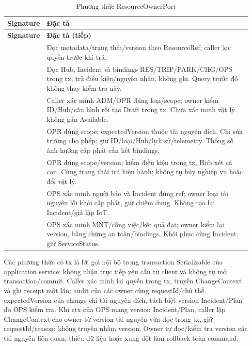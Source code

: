 \begin{longtable}{|L{58mm}|L{81mm}|}
\caption{Phương thức ResourceOwnerPort}\label{tab:p3-resource-owner-port}\\\hline
\textbf{Signature} & \textbf{Đặc tả}\\\hline
\endfirsthead
\hline\textbf{Signature} & \textbf{Đặc tả (tiếp)}\\\hline\endhead
{} &
Đọc metadata/trạng thái/version theo ResourceRef; caller lọc quyền trước khi trả.\\\hline
{} &
Đọc Hub, Incident và bindings RES/TRIP/PARK/CHG/OPS trong tx; trả điều kiện/nguyên nhân, không ghi. Query trước đó không thay kiểm tra này.\\\hline
{} &
Caller xác minh ADM/OPR đúng loại/scope; owner kiểm ID/Hub/cấu hình rồi tạo Draft trong tx. Chưa xác minh vật lý không gán Available.\\\hline
{} &
OPR đúng scope; expectedVersion thuộc tài nguyên đích. Chỉ sửa trường cho phép; giữ ID/loại/Hub/lịch sử/telemetry. Thông số ảnh hưởng cấp phát cần hết bindings.\\\hline
{} &
OPR đúng scope/version; kiểm điều kiện trong tx, Hub xét cả con. Cùng trạng thái trả hiện hành; không tự hủy nghiệp vụ hoặc đổi vật lý.\\\hline
{} &
OPS xác minh người báo và Incident đúng ref; owner loại tài nguyên lỗi khỏi cấp phát, giữ chiếm dụng. Không tạo lại Incident/giả lập IoT.\\\hline
{} &
OPS xác minh MNT/công việc/kết quả đạt; owner kiểm lại version, bằng chứng an toàn/bindings. Khôi phục cùng Incident, giữ ServiceStatus.\\\hline
\end{longtable}

Các phương thức có tx là lời gọi nội bộ trong transaction Serializable của application service; không nhận trực tiếp yêu cầu từ client và không tự mở transaction/commit. Caller xác minh lại quyền trong tx, truyền ChangeContext và ghi receipt một lần; audit của các owner cùng requestId/chủ thể. expectedVersion của change chỉ tài nguyên đích, tách biệt version Incident/Plan do OPS kiểm tra. Khi ctx của OPS mang version Incident/Plan, caller lập ChangeContext cho owner từ version tài nguyên vừa đọc trong tx, giữ requestId/reason; không truyền nhầm version. Owner tự đọc/kiểm tra version các tài nguyên liên quan; thiếu dữ liệu hoặc xung đột làm rollback toàn command.

